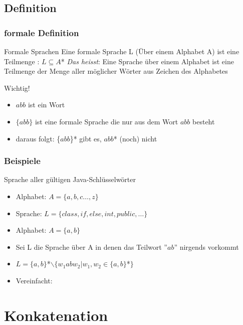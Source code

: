 \documentclass{beamer}
\begin{document}
\subsection[Definition]{Definition}
\begin{frame}
\frametitle{formale Definition}
\begin{block}{Formale Sprachen}
Eine formale Sprache L (Über einem Alphabet A) ist eine
Teilmenge : $L \subseteq A$*
\newline \newline \emph{Das heisst}: Eine Sprache über einem Alphabet ist eine
Teilmenge der Menge aller möglicher Wörter aus Zeichen
des Alphabetes
\end{block}
\begin{block}{Wichtig!}
\begin{itemize}[<+->]
\item $abb$ ist ein Wort
\item $\{abb\}$ ist eine formale Sprache die nur aus dem Wort $abb$ besteht
\item daraus folgt: \{$abb$\}* gibt es, $abb$* (noch) nicht
\end{itemize}
\end{block}
\end{frame}
\begin{frame}
\frametitle{Beispiele}
\begin{example}
Sprache aller gültigen Java-Schlüsselwörter
\begin{itemize}[<+->]
\item Alphabet: $A = \{a,b,c\ldots,z\}$
\item Sprache: $L = \{class, if, else, int, public, \ldots\}$
\end{itemize}
\end{example}
\begin{example}
\begin{itemize}[<+->]
\item Alphabet: $A = \{a,b\}$
\item Sei L die Sprache über A in denen das Teilwort ''$ab$'' nirgends vorkommt
\item $L = \{a,b\}$*$\backslash\{w_{1}abw_{2}|w_{1},w_{2}\in\{a,b\}$*$\}$
\item Vereinfacht:
\end{itemize}
\end{example}
\end{frame}
\section{Konkatenation}
\end{document}
